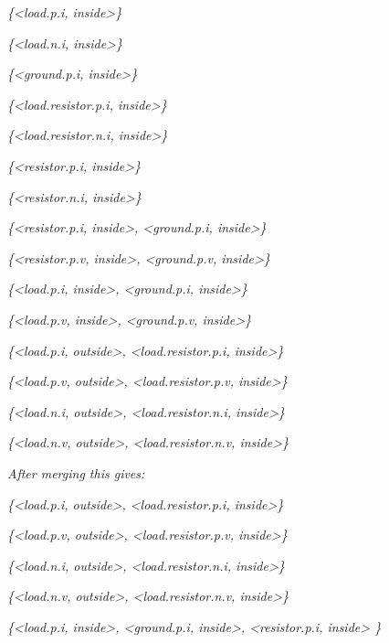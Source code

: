 \documentclass[10pt,a4paper]{report}
\begin{document}
\emph{\{\textless{}load.p.i, inside\textgreater{}\}}

\emph{\{\textless{}load.n.i, inside\textgreater{}\}}

\emph{\{\textless{}ground.p.i, inside\textgreater{}\}}

\emph{\{\textless{}load.resistor.p.i, inside\textgreater{}\}}

\emph{\{\textless{}load.resistor.n.i, inside\textgreater{}\}}

\emph{\{\textless{}resistor.p.i, inside\textgreater{}\}}

\emph{\{\textless{}resistor.n.i, inside\textgreater{}\}}

\emph{\{\textless{}resistor.p.i, inside\textgreater{},
\textless{}ground.p.i, inside\textgreater{}\}}

\emph{\{\textless{}resistor.p.v, inside\textgreater{},
\textless{}ground.p.v, inside\textgreater{}\}}

\emph{\{\textless{}load.p.i, inside\textgreater{},
\textless{}ground.p.i, inside\textgreater{}\}}

\emph{\{\textless{}load.p.v, inside\textgreater{},
\textless{}ground.p.v, inside\textgreater{}\}}

\emph{\{\textless{}load.p.i, outside\textgreater{},
\textless{}load.resistor.p.i, inside\textgreater{}\}}

\emph{\{\textless{}load.p.v, outside\textgreater{},
\textless{}load.resistor.p.v, inside\textgreater{}\}}

\emph{\{\textless{}load.n.i, outside\textgreater{},
\textless{}load.resistor.n.i, inside\textgreater{}\}}

\emph{\{\textless{}load.n.v, outside\textgreater{},
\textless{}load.resistor.n.v, inside\textgreater{}\}}

\emph{After merging this gives:}

\emph{\{\textless{}load.p.i, outside\textgreater{},
\textless{}load.resistor.p.i, inside\textgreater{}\}}

\emph{\{\textless{}load.p.v, outside\textgreater{},
\textless{}load.resistor.p.v, inside\textgreater{}\}}

\emph{\{\textless{}load.n.i, outside\textgreater{},
\textless{}load.resistor.n.i, inside\textgreater{}\}}

\emph{\{\textless{}load.n.v, outside\textgreater{},
\textless{}load.resistor.n.v, inside\textgreater{}\}}

\emph{\{\textless{}load.p.i, inside\textgreater{},
\textless{}ground.p.i, inside\textgreater{}, \textless{}resistor.p.i,
inside\textgreater{} \}}
\end{document}
